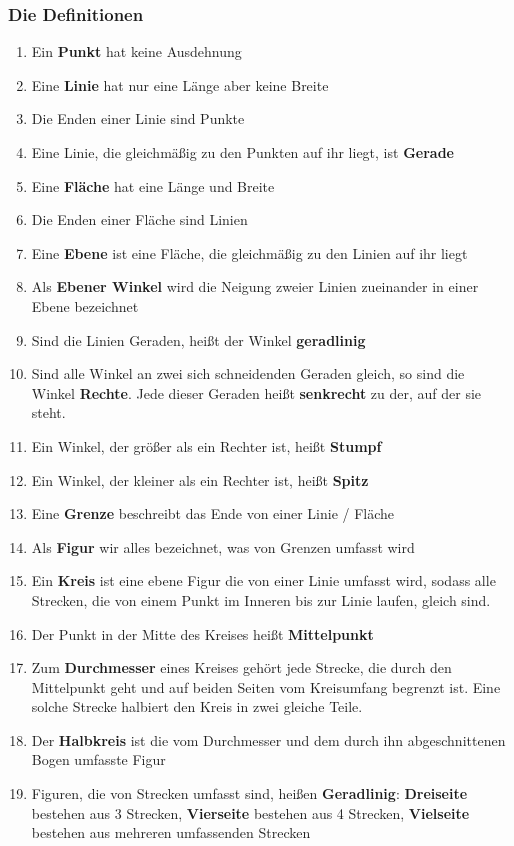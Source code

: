 \subsubsection{Die Definitionen}
\begin{enumerate}
	\item Ein \textbf{Punkt} hat keine Ausdehnung
	\item Eine \textbf{Linie} hat nur eine Länge aber keine Breite
	\item Die Enden einer Linie sind Punkte
	\item Eine Linie, die gleichmäßig zu den Punkten auf ihr liegt, ist \textbf{Gerade}
	\item Eine \textbf{Fläche} hat eine Länge und Breite
	\item Die Enden einer Fläche sind Linien
	\item Eine \textbf{Ebene} ist eine Fläche, die gleichmäßig zu den Linien auf ihr liegt
	\item Als \textbf{Ebener Winkel} wird die Neigung zweier Linien zueinander in einer Ebene bezeichnet
	\item Sind die Linien Geraden, heißt der Winkel \textbf{geradlinig}
	\item Sind alle Winkel an zwei sich schneidenden Geraden gleich, so sind die Winkel \textbf{Rechte}. Jede dieser Geraden heißt \textbf{senkrecht} zu der, auf der sie steht.
	\item Ein Winkel, der größer als ein Rechter ist, heißt \textbf{Stumpf}
	\item Ein Winkel, der kleiner als ein Rechter ist, heißt \textbf{Spitz}
	\item Eine \textbf{Grenze} beschreibt das Ende von einer Linie / Fläche
	\item Als \textbf{Figur} wir alles bezeichnet, was von Grenzen umfasst wird
	\item Ein \textbf{Kreis} ist eine ebene Figur die von einer Linie umfasst wird, sodass alle Strecken, die von einem Punkt im Inneren bis zur Linie laufen, gleich sind.
	\item  Der Punkt in der Mitte des Kreises heißt \textbf{Mittelpunkt}
	\item Zum \textbf{Durchmesser} eines Kreises gehört jede Strecke, die durch den Mittelpunkt geht und auf beiden Seiten vom Kreisumfang begrenzt ist. Eine solche Strecke halbiert den Kreis in zwei gleiche Teile.
	\item Der \textbf{Halbkreis} ist die vom Durchmesser und dem durch ihn abgeschnittenen Bogen umfasste Figur
	\item Figuren, die von Strecken umfasst sind, heißen \textbf{Geradlinig}: \textbf{Dreiseite} bestehen aus 3 Strecken, \textbf{Vierseite} bestehen aus 4 Strecken, \textbf{Vielseite} bestehen aus mehreren umfassenden Strecken

\end{enumerate}
